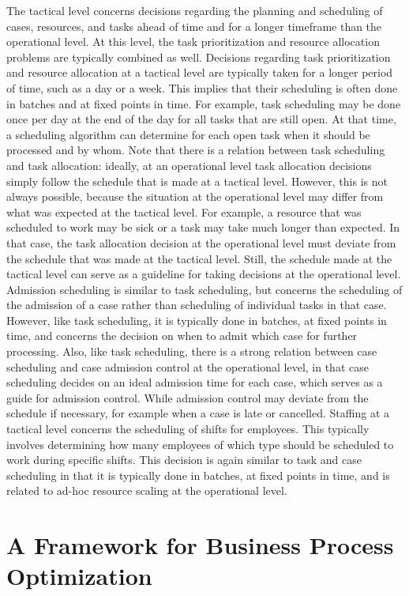 \documentclass[runningheads]{llncs}
\begin{document}
The tactical level concerns decisions regarding the planning and scheduling of cases, resources, and tasks ahead of time and for a longer timeframe than the operational level. At this level, the task prioritization and resource allocation problems are typically combined as well. Decisions regarding task prioritization and resource allocation at a tactical level are typically taken for a longer period of time, such as a day or a week. This implies that their scheduling is often done in batches and at fixed points in time. For example, task scheduling may be done once per day at the end of the day for all tasks that are still open. At that time, a scheduling algorithm can determine for each open task when it should be processed and by whom. Note that there is a relation between task scheduling and task allocation: ideally, at an operational level task allocation decisions simply follow the schedule that is made at a tactical level. However, this is not always possible, because the situation at the operational level may differ from what was expected at the tactical level. For example, a resource that was scheduled to work may be sick or a task may take much longer than expected. In that case, the task allocation decision at the operational level must deviate from the schedule that was made at the tactical level. Still, the schedule made at the tactical level can serve as a guideline for taking decisions at the operational level. Admission scheduling is similar to task scheduling, but concerns the scheduling of the admission of a case rather than scheduling of individual tasks in that case. However, like task scheduling, it is typically done in batches, at fixed points in time, and concerns the decision on when to admit which case for further processing. Also, like task scheduling, there is a strong relation between case scheduling and case admission control at the operational level, in that case scheduling decides on an ideal admission time for each case, which serves as a guide for admission control. While admission control may deviate from the schedule if necessary, for example when a case is late or cancelled. Staffing at a tactical level concerns the scheduling of shifts for employees. This typically involves determining how many employees of which type should be scheduled to work during specific shifts. This decision is again similar to task and case scheduling in that it is typically done in batches, at fixed points in time, and is related to ad-hoc resource scaling at the operational level.


\section{A Framework for Business Process Optimization}\label{sec:framework}
\end{document}
